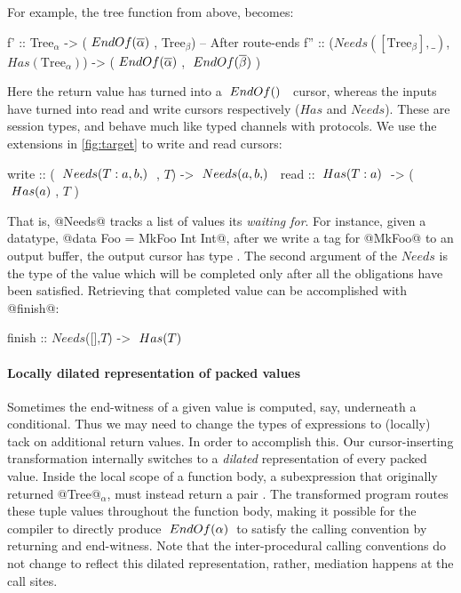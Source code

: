 \documentclass[a4paper,english]{lipics-v2016}
\newcommand{\fresh}[1]{\ensuremath{#1}}
\newcommand{\freshA}{\fresh{\alpha}}
\newcommand{\freshB}{\fresh{\beta}}
\newcommand{\locend}[1]{\ensuremath{\overline{#1}}}
\begin{document}
\noindent
For example, the tree function from above, becomes:
\begin{code}
  f'  :: Tree$_\freshA$ -> ($\ENDOF{\locend{\freshA}}$, Tree$_\freshB$) -- After route-ends
  f'' :: ($Needs([\text{Tree}_\freshB],\_)$, $Has(\text{Tree}_\freshA)$) -> ($\ENDOF{\locend{\freshA}}$, $\ENDOF{\locend{\freshB}}$)
\end{code}
%

Here the return value has turned into a $\ENDOF$ cursor, whereas the inputs have
turned into read and write cursors respectively ($Has$ and $Needs$).  These are session types, and
behave much like typed channels with protocols.  We use the extensions in
\cref{fig:target} to write and read cursors:

\begin{code}
  write :: ( $\NEEDS{T:a, b}$, $T$) ->  $\NEEDS{a,b}$
  read  :: $\; Has(T:a) \;$ ->   ( $\; Has(a) \;$, $T$ )
\end{code}

That is, @Needs@ tracks a list of values its {\em waiting for}.  For instance,
given a datatype, @data Foo = MkFoo Int Int@, after we write a tag for @MkFoo@
to an output buffer, the output cursor has type .
The second argument of the $Needs$ is the type of the value which will be
completed only after all the obligations have been satisfied.  Retrieving that
completed value can be accomplished with @finish@:

\begin{code}
  finish :: $Needs$([],$T$) -> $\; Has(T) \;$
\end{code}


\paragraph*{Locally dilated representation of packed values}

Sometimes the end-witness of a given value is computed, say, underneath a
conditional.  Thus we may need to change the types of expressions to (locally)
tack on additional return values.
%
In order to accomplish this.  Our cursor-inserting transformation internally
switches to a {\em dilated} representation of every packed value.  Inside the
local scope of a function body, a subexpression that originally returned @Tree@$_\freshA$,
must instead return a pair \il{($Has$(Tree$_\freshA$), $\ENDOF{\freshA}$)}.
%
The transformed program routes these tuple values throughout the function body,
making it possible for the compiler to directly produce $\ENDOF{\freshA}$ to
satisfy the calling convention by returning and end-witness.
%
Note that the inter-procedural calling conventions do not change to reflect this
dilated representation, rather, mediation happens at the call sites.
\end{document}
